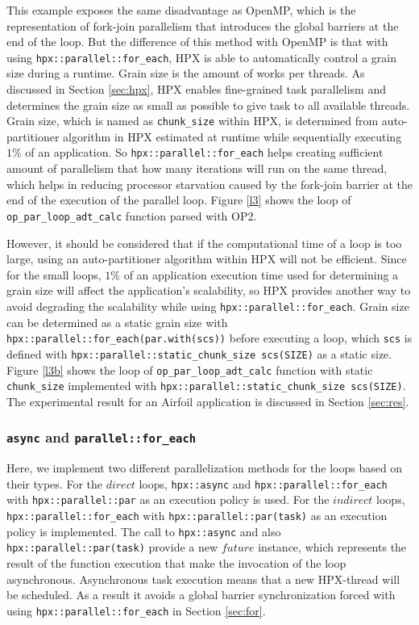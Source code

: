 \documentclass[conference]{IEEEtran}
\begin{document}
This example exposes the same disadvantage as OpenMP, which is the representation of fork-join parallelism that introduces the global barriers at the end of the loop. But the difference of this method with OpenMP is that with using \texttt{hpx::parallel::for\_each}, HPX is able to automatically control a grain size during a runtime. Grain size is the amount of works per threads. As discussed in Section \ref{sec:hpx}, HPX enables fine-grained task parallelism and determines the grain size as small as possible to give task to all available threads. Grain size, which is named as \texttt{chunk\_size} within HPX, is determined from auto-partitioner algorithm in HPX estimated at runtime while sequentially executing $1\%$ of an application. So \texttt{hpx::parallel::for\_each} helps creating sufficient amount of parallelism that how many iterations will run on the same thread, which helps in reducing processor starvation caused by the fork-join barrier at the end of the execution of the parallel loop.  Figure \ref{l3} shows the loop of \texttt{op\_par\_loop\_adt\_calc} function parsed with OP2. 

However, it should be considered that if the computational time of a loop is too large, using an auto-partitioner algorithm within HPX will not be efficient. Since for the small loops, $1\%$ of an application execution time used for determining a grain size will affect the application's scalability, so HPX provides another way to avoid degrading the scalability while using \texttt{hpx::parallel::for\_each}. Grain size can be determined as a static grain size with \texttt{hpx::parallel::for\_each(par.with(scs))} before executing a loop, which \texttt{scs} is defined with \texttt{hpx::parallel::static\_chunk\_size scs(SIZE)} as a static size.  Figure \ref{l3b} shows the loop of \texttt{op\_par\_loop\_adt\_calc} function with static \texttt{chunk\_size} implemented with \texttt{hpx::parallel::static\_chunk\_size scs(SIZE)}. The experimental result for an Airfoil application is discussed in Section \ref{sec:res}.

\subsubsection{\textbf{\texttt{async} and \texttt{parallel::for\_each}}}
\label{sec:async}

Here, we implement two different parallelization methods for the loops based on their types. For the $direct$ loops, \texttt{hpx::async} and \texttt{hpx::parallel::for\_each} with \texttt{hpx::parallel::par} as an execution policy is used. For  the $indirect$ loops,  \texttt{hpx::parallel::for\_each} with \texttt{hpx::parallel::par(task)} as an execution policy is implemented. The call to \texttt{hpx::async} and also \texttt{hpx::parallel::par(task)} provide a new $future$ instance, which represents the result of the function execution that make the invocation of the loop asynchronous. Asynchronous task execution means that a new HPX-thread will be scheduled. As a result it avoids a global barrier synchronization forced with using \texttt{hpx::parallel::for\_each} in Section \ref{sec:for}.
\end{document}
